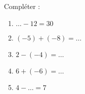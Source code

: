 
\begin{exercice}\label{exo2smath-0310}

    Compléter :
    \begin{multicols}{3}
        \begin{enumerate}
            \item
                \( \ldots-12=30\)
            \item
                \( (-5)+(-8)=\ldots\)
            \item
                \( 2-(-4)=\ldots\)
            \item
                \( 6+(-6)=\ldots\)
            \item
                \( 4-\ldots=7\)
        \end{enumerate}
    \end{multicols}

\end{exercice}
